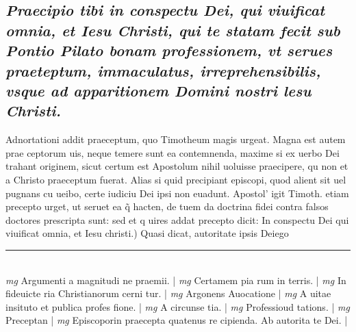 \documentclass{article}
\begin{document}
\begin{pages}
\subsection*{\textit{Praecipio tibi in conspectu Dei, qui viuificat omnia, et Iesu Christi, qui te statam fecit sub Pontio Pilato bonam professionem, vt serues praeteptum, immaculatus, irreprehensibilis, vsque ad apparitionem Domini nostri lesu Christi. }}\pstart Adnortationi addit praeceptum, quo Timotheum magis urgeat. Magna est autem prae ceptorum uis, neque temere sunt ea contemnenda, maxime si ex uerbo Dei trahant originem, sicut certum est Apostolum nihil uoluisse praecipere, qu non et a Christo praeceptum fuerat. Alias si quid precipiant episcopi, quod alient sit uel pugnans cu ueibo, certe iudiciu Dei ipsi non euadunt. Apostol' igit Timoth. etiam precepto urget, ut seruet ea q̃ hacten, de tuem da doctrina fidei contra falsos doctores prescripta sunt: sed et q uires addat precepto dicit: In conspectu Dei qui viuificat omnia, et Iesu christi.) Quasi dicat, autoritate ipsis Deiego  \pend
\vspace{0.5cm}\noindent
\vspace{0.2cm}\rule{1cm}{0.2pt}\\ 
\hspace{0.2cm}\textit{mg}
\footnotesize Argumenti a magnitudi ne praemii. 
\normalsize| 
\hspace{0.2cm}\textit{mg}
\footnotesize Certamem pia rum in terris. 
\normalsize| 
\hspace{0.2cm}\textit{mg}
\footnotesize In fideuicte ria Christianorum cerni tur. 
\normalsize| 
\hspace{0.2cm}\textit{mg}
\footnotesize Argonens Auocatione 
\normalsize| 
\hspace{0.2cm}\textit{mg}
\footnotesize A uitae insituto et publica profes fione. 
\normalsize| 
\hspace{0.2cm}\textit{mg}
\footnotesize A circunse tia. 
\normalsize| 
\hspace{0.2cm}\textit{mg}
\footnotesize Professioud tations. 
\normalsize| 
\hspace{0.2cm}\textit{mg}
\footnotesize Preceptan 
\normalsize| 
\hspace{0.2cm}\textit{mg}
\footnotesize Episcoporin praecepta quatenus re cipienda. Ab autorita te Dei. 
\normalsize| 

\end{pages}
\end{document}
